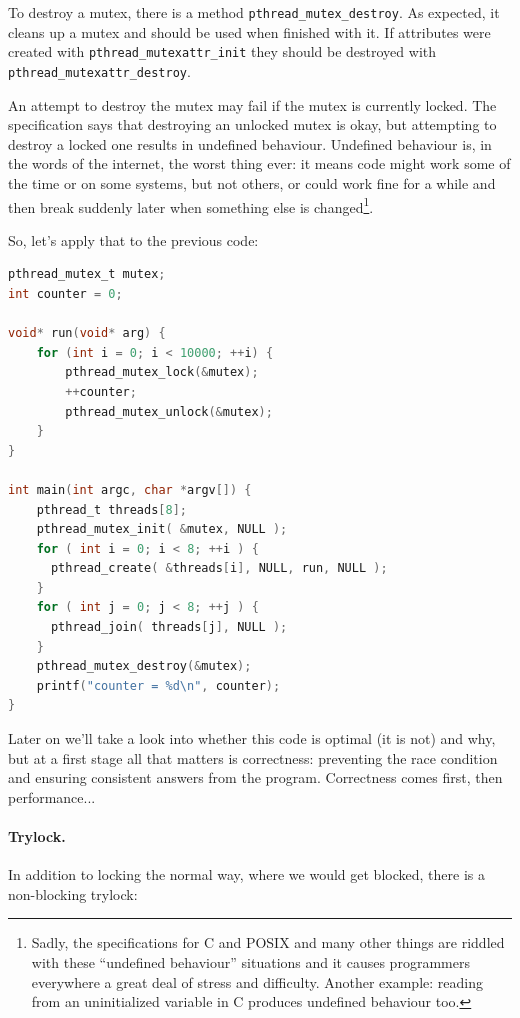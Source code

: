 To destroy a mutex, there is a method \texttt{pthread\_mutex\_destroy}. As expected, it cleans up a mutex and should be used when finished with it. If attributes were created with \texttt{pthread\_mutexattr\_init} they should be destroyed with \texttt{pthread\_mutexattr\_destroy}.

An attempt to destroy the mutex may fail if the mutex is currently locked. The specification says that destroying an unlocked mutex is okay, but attempting to destroy a locked one results in undefined behaviour. Undefined behaviour is, in the words of the internet, the worst thing ever: it means code might work some of the time or on some systems, but not others, or could work fine for a while and then break suddenly later when something else is changed\footnote{Sadly, the specifications for C and POSIX and many other things are riddled with these ``undefined behaviour'' situations and it causes programmers everywhere a great deal of stress and difficulty. Another example: reading from an uninitialized variable in C produces undefined behaviour too.}.


So, let's apply that to the previous code:
\begin{lstlisting}[language=C]
pthread_mutex_t mutex;
int counter = 0;

void* run(void* arg) {
    for (int i = 0; i < 10000; ++i) {
        pthread_mutex_lock(&mutex);
        ++counter;
        pthread_mutex_unlock(&mutex);
    }
}

int main(int argc, char *argv[]) {
    pthread_t threads[8];
    pthread_mutex_init( &mutex, NULL );
    for ( int i = 0; i < 8; ++i ) {
      pthread_create( &threads[i], NULL, run, NULL );
    }
    for ( int j = 0; j < 8; ++j ) {
      pthread_join( threads[j], NULL );
    }
    pthread_mutex_destroy(&mutex);
    printf("counter = %d\n", counter);
}
\end{lstlisting}

Later on we'll take a look into whether this code is optimal (it is not) and why, but at a first stage all that matters is correctness: preventing the race condition and ensuring consistent answers from the program. Correctness comes first, then performance...

\paragraph{Trylock.}

In addition to locking the normal way, where we would get blocked, there is a non-blocking trylock: 


